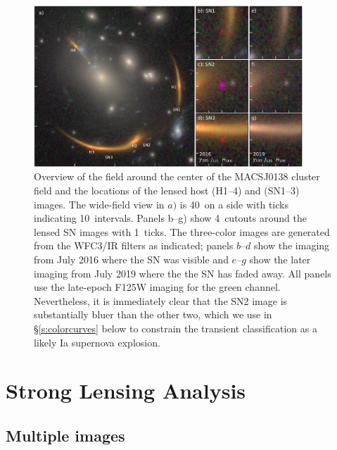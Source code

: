\documentclass[twocolumn]{aastex63}
\begin{document}
\begin{figure}
    \centering
    \includegraphics[width=0.9\textwidth]{Paper/Figures/fig1_layout.pdf}
    \caption{Overview of the field around the center of the MACSJ0138 cluster field and the locations of the lensed host (H1--4) and \SNABC (SN1--3) images. The wide-field view in $a)$ is 40\arcsec\ on a side with ticks indicating 10\arcsec\ intervals.  Panels b--g) show 4\arcsec\ cutouts around the lensed SN images with 1\arcsec\ ticks.  The three-color images are generated from the WFC3/IR filters as indicated; panels $b$--$d$ show the imaging from July 2016 where the SN was visible and $e$--$g$ show the later imaging from July 2019 where the the SN has faded away.  All panels use the late-epoch F125W imaging for the green channel.  Nevertheless, it is immediately clear that the SN2 image is substantially bluer than the other two, which we use in \S\ref{s:colorcurves} below to constrain the transient classification as a likely Ia supernova explosion.}
    
    \label{fig:layout}
\end{figure}

\section{Strong Lensing Analysis}
\label{s:lensing}

\subsection{Multiple images}
\label{ss:images}

\end{document}
